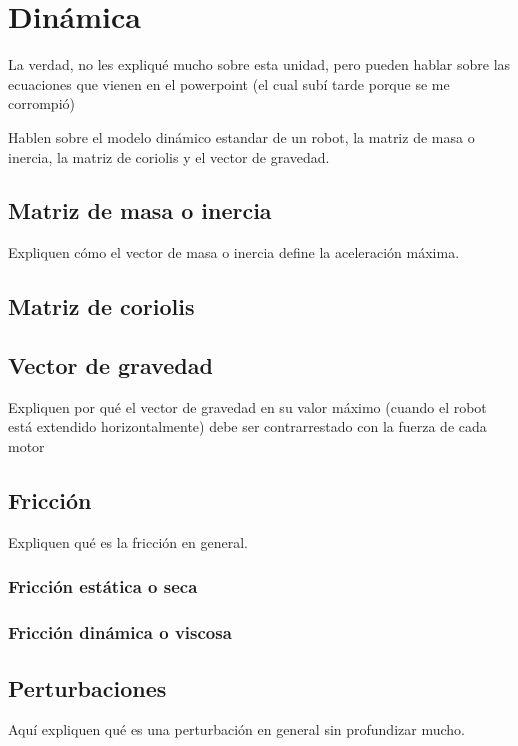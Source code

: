 \section{Dinámica} \label{sec:dinamica}

La verdad, no les expliqué mucho sobre esta unidad, pero pueden hablar sobre las ecuaciones que vienen en el powerpoint (el cual subí tarde porque se me corrompió)

Hablen sobre el modelo dinámico estandar de un robot, la matriz de masa o inercia, la matriz de coriolis y el vector de gravedad. 

\subsection{Matriz de masa o inercia}
Expliquen cómo el vector de masa o inercia define la aceleración máxima.

\subsection{Matriz de coriolis}

\subsection{Vector de gravedad}

Expliquen por qué el vector de gravedad en su valor máximo (cuando el robot está extendido horizontalmente) debe ser contrarrestado con la fuerza de cada motor

\subsection{Fricción}
Expliquen qué es la fricción en general.

\subsubsection{Fricción estática o seca}

\subsubsection{Fricción dinámica o viscosa}

\subsection{Perturbaciones}
Aquí expliquen qué es una perturbación en general sin profundizar mucho.